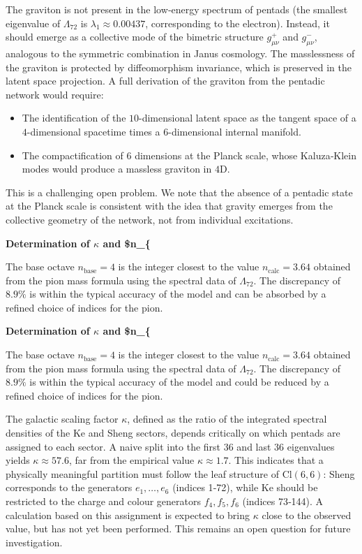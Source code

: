 \documentclass[11pt]{article}
\providecommand{\tightlist}{\setlength{\itemsep}{2pt}\setlength{\parskip}{6pt}}
\providecommand{\tightlist}{%
  \setlength{\itemsep}{2pt}\setlength{\parskip}{6pt}
}
\begin{document}
The graviton is not present in the low‑energy spectrum of pentads (the
smallest eigenvalue of \(\Lambda_{72}\) is
\(\lambda_1 \approx 0.00437\), corresponding to the electron). Instead,
it should emerge as a collective mode of the bimetric structure
\(g_{\mu\nu}^+\) and \(g_{\mu\nu}^-\), analogous to the symmetric
combination in Janus cosmology. The masslessness of the graviton is
protected by diffeomorphism invariance, which is preserved in the latent
space projection. A full derivation of the graviton from the pentadic
network would require:

\begin{itemize}
\tightlist
\item
  The identification of the \(10\)-dimensional latent space as the
  tangent space of a \(4\)-dimensional spacetime times a
  \(6\)-dimensional internal manifold.
\item
  The compactification of \(6\) dimensions at the Planck scale, whose
  Kaluza‑Klein modes would produce a massless graviton in \(4\)D.
\end{itemize}

This is a challenging open problem. We note that the absence of a
pentadic state at the Planck scale is consistent with the idea that
gravity emerges from the collective geometry of the network, not from
individual excitations.

\textbf{Determination of \(\kappa\) and \$n\_\{}

The base octave \(n_{\text{base}}=4\) is the integer closest to the
value \(n_{\text{calc}}=3.64\) obtained from the pion mass formula using
the spectral data of \(\Lambda_{72}\). The discrepancy of \(8.9\%\) is
within the typical accuracy of the model and can be absorbed by a
refined choice of indices for the pion.

\textbf{Determination of \(\kappa\) and \$n\_\{}

The base octave \(n_{\text{base}}=4\) is the integer closest to the
value \(n_{\text{calc}}=3.64\) obtained from the pion mass formula using
the spectral data of \(\Lambda_{72}\). The discrepancy of \(8.9\%\) is
within the typical accuracy of the model and could be reduced by a
refined choice of indices for the pion.

The galactic scaling factor \(\kappa\), defined as the ratio of the
integrated spectral densities of the Ke and Sheng sectors, depends
critically on which pentads are assigned to each sector. A naive split
into the first 36 and last 36 eigenvalues yields
\(\kappa \approx 57.6\), far from the empirical value
\(\kappa \approx 1.7\). This indicates that a physically meaningful
partition must follow the leaf structure of \(\mathrm{Cl}(6,6)\): Sheng
corresponds to the generators \(e_1,\dots,e_6\) (indices 1‑72), while Ke
should be restricted to the charge and colour generators \(f_4,f_5,f_6\)
(indices 73‑144). A calculation based on this assignment is expected to
bring \(\kappa\) close to the observed value, but has not yet been
performed. This remains an open question for future investigation.
\end{document}
